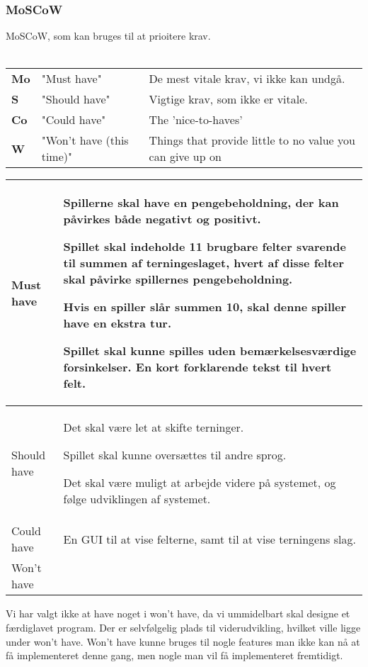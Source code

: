 \subsubsection{MoSCoW}
MoSCoW, som kan bruges til at prioitere krav. \\\\
\begin{tabular}{lll}
    \textbf{Mo} &   
    "Must have"                 &
    De mest vitale krav, vi ikke kan undgå. \\

    \textbf{S}  &   
    "Should have"               & 
    Vigtige krav, som ikke er vitale. \\

    \textbf{Co} &   
    "Could have"                & 
    The 'nice-to-haves' \\

    \textbf{W}  &   
    "Won’t have (this time)"    & 
    Things that provide little to no value you can give up on \\
    
\end{tabular}

\begin{center}
    \begin{tabular}{ | l | p{13cm} |}
    \hline
    Must have & Spillerne skal have en pengebeholdning, der kan påvirkes både negativt og positivt.

    Spillet skal indeholde 11 brugbare felter svarende til summen af terningeslaget, hvert af disse felter skal påvirke spillernes pengebeholdning.

    Hvis en spiller slår summen 10, skal denne spiller have en ekstra tur.

    Spillet skal kunne spilles uden bemærkelsesværdige forsinkelser. En kort forklarende tekst til hvert felt. \\
    
    \hline
    Should have & Det skal være let at skifte terninger.

    Spillet skal kunne oversættes til andre sprog.

    Det skal være muligt at arbejde videre på systemet, og følge udviklingen af systemet. \\
    \hline
    Could have & En GUI til at vise felterne, samt til at vise terningens slag. \\
    \hline
    Won't have &  \\
    \hline
    \end{tabular}
\end{center}

\noindent
Vi har valgt ikke at have noget i won't have, da vi ummidelbart skal designe et færdiglavet program. Der er selvfølgelig plads til viderudvikling, hvilket ville ligge under won't have. Won't have kunne bruges til nogle features man ikke kan nå at få implementeret denne gang, men nogle man vil få implementeret fremtidigt.

